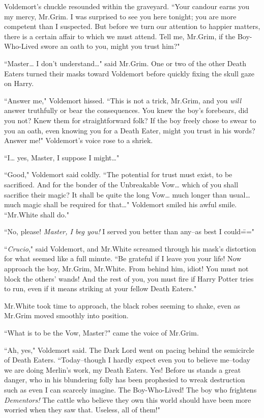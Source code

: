 Voldemort's chuckle resounded within the graveyard. ``Your candour earns you my mercy, Mr.\?Grim. I was surprised to see you here tonight; you are more competent than I suspected. But before we turn our attention to happier matters, there is a certain affair to which we must attend. Tell me, Mr.\?Grim, if the Boy-Who-Lived swore an oath to you, might you trust him?"

``Master{\ldots} I don't understand{\ldots}" said Mr.\?Grim. One or two of the other Death Eaters turned their masks toward Voldemort before quickly fixing the skull gaze on Harry.

``Answer me," Voldemort hissed. ``This is not a trick, Mr.\?Grim, and you \emph{will} answer truthfully or bear the consequences. You knew the boy's forebears, did you not? Knew them for straightforward folk? If the boy freely chose to swear to you an oath, even knowing you for a Death Eater, might you trust in his words? Answer me!" Voldemort's voice rose to a shriek.

``I{\ldots} yes, Master, I suppose I might{\ldots}"

``Good," Voldemort said coldly. ``The potential for trust must exist, to be sacrificed. And for the bonder of the Unbreakable Vow{\ldots} which of you shall sacrifice their magic? It shall be quite the long Vow{\ldots} much longer than usual{\ldots} much magic shall be required for that{\ldots}" Voldemort smiled his awful smile. ``Mr.\?White shall do."

``No, please! \emph{Master, I beg you!} I served you better than any\---as best I could\==="

``\emph{Crucio}," said Voldemort, and Mr.\?White screamed through his mask's distortion for what seemed like a full minute. ``Be grateful if I leave you your life! Now approach the boy, Mr.\?Grim, Mr.\?White. From behind him, idiot! You must not block the others' wands! And the rest of you, you must fire if Harry Potter tries to run, even if it means striking at your fellow Death Eaters."

Mr.\?White took time to approach, the black robes seeming to shake, even as Mr.\?Grim moved smoothly into position.

``What is to be the Vow, Master?" came the voice of Mr.\?Grim.

``Ah, yes," Voldemort said. The Dark Lord went on pacing behind the semicircle of Death Eaters. ``Today\---though I hardly expect even you to believe me\---today we are doing Merlin's work, my Death Eaters. Yes! Before us stands a great danger, who in his blundering folly has been prophesied to wreak destruction such as even I can scarcely imagine. The Boy-Who-Lived! The boy who frightens \emph{Dementors!} The cattle who believe they own this world should have been more worried when they saw that. Useless, all of them!"

